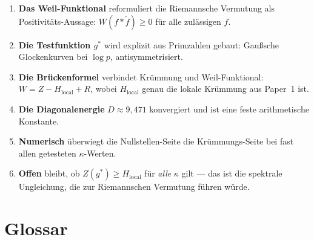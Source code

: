 \documentclass[11pt,a4paper]{article}
\theoremstyle{plain}
\theoremstyle{definition}
\theoremstyle{remark}
\newcommand{\Hlocal}{H_{\mathrm{local}}}
\begin{document}
	\begin{enumerate}
		\item \textbf{Das Weil-Funktional} reformuliert die Riemannsche Vermutung als
		Positivit\"ats-Aussage: $W(f * \check{f}) \geq 0$ f\"ur alle zul\"assigen $f$.
		
		\item \textbf{Die Testfunktion $g^*$} wird explizit aus Primzahlen gebaut:
		Gau\ss sche Glockenkurven bei $\log p$, antisymmetrisiert.
		
		\item \textbf{Die Br\"uckenformel} verbindet Kr\"ummung und Weil-Funktional:
		$W = Z - \Hlocal + R$, wobei $\Hlocal$ genau die lokale Kr\"ummung aus
		Paper~1 ist.
		
		\item \textbf{Die Diagonalenergie} $D \approx 9{,}471$ konvergiert und ist
		eine feste arithmetische Konstante.
		
		\item \textbf{Numerisch} \"uberwiegt die Nullstellen-Seite die
		Kr\"ummungs-Seite bei fast allen getesteten $\kappa$-Werten.
		
		\item \textbf{Offen} bleibt, ob $Z(g^*) \geq \Hlocal$ f\"ur \emph{alle}
		$\kappa$ gilt --- das ist die spektrale Ungleichung, die zur
		Riemannschen Vermutung f\"uhren w\"urde.
	\end{enumerate}
	
	\begin{center}
	\end{center}
	
	
	
	\newpage
	\section*{Glossar}
	
\end{document}
